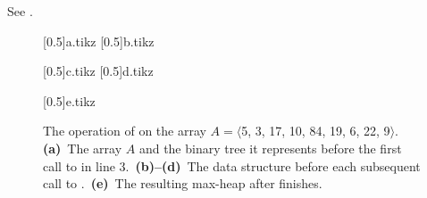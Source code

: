 See .
\begin{figure}[htb]
    \captionsetup[subfigure]{}
    \subcaptionbox{\label{fig:6.3-1a}}[0.5\textwidth]{{a.tikz}}
    \subcaptionbox{\label{fig:6.3-1b}}[0.5\textwidth]{{b.tikz}}
    \par\vspace{7mm}
    \subcaptionbox{\label{fig:6.3-1c}}[0.5\textwidth]{{c.tikz}}
    \subcaptionbox{\label{fig:6.3-1d}}[0.5\textwidth]{{d.tikz}}
    \par\vspace{7mm}
    \subcaptionbox{\label{fig:6.3-1e}}[0.5\textwidth]{{e.tikz}}
    \caption{The operation of  on the array $A=\langle$5, 3, 17, 10, 84, 19, 6, 22, 9$\rangle$.\,
    \textbf{(a)}\, The array $A$ and the binary tree it represents before the first call to  in line 3.\,
    \textbf{(b)--(d)}\, The data structure before each subsequent call to .\,
    \textbf{(e)}\, The resulting max-heap after  finishes.} \label{fig:6.3-1}
\end{figure}
